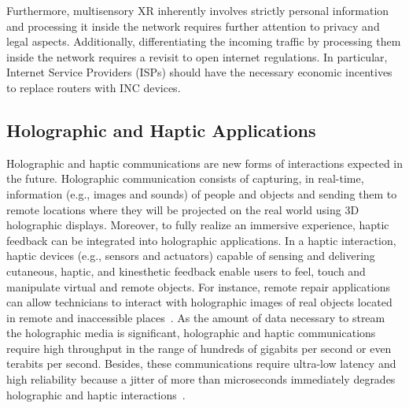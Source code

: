Furthermore, multisensory XR inherently involves strictly personal information and processing it inside the network requires further attention to privacy and legal aspects.  Additionally, differentiating the incoming traffic by processing them inside the network requires a revisit to open internet regulations. In particular, Internet Service Providers (ISPs) should have the necessary economic incentives to replace routers with INC devices.

 

 \subsection{Holographic and Haptic Applications}
 
 \noindent Holographic and haptic communications are new forms of interactions expected in the future. Holographic communication consists of capturing, in real-time, information (e.g., images and sounds) of people and objects and sending them to remote locations where they will be projected on the real world using 3D holographic displays. Moreover, to fully realize an immersive experience, haptic feedback can be integrated into holographic applications. In a haptic interaction, haptic devices (e.g., sensors and actuators) capable of sensing and delivering cutaneous, haptic, and kinesthetic feedback enable users to feel, touch and manipulate virtual and remote objects. For instance, remote repair applications can allow technicians to interact with holographic images of real objects located in remote and inaccessible places~\cite{9078581}. As the amount of data necessary to stream the holographic media is significant, holographic and haptic communications require high throughput in the range of hundreds of gigabits per second or even terabits per second. Besides, these communications require ultra-low latency and high reliability because a jitter of more than microseconds immediately degrades holographic and haptic interactions~\cite{9078581,9178307}.
 
